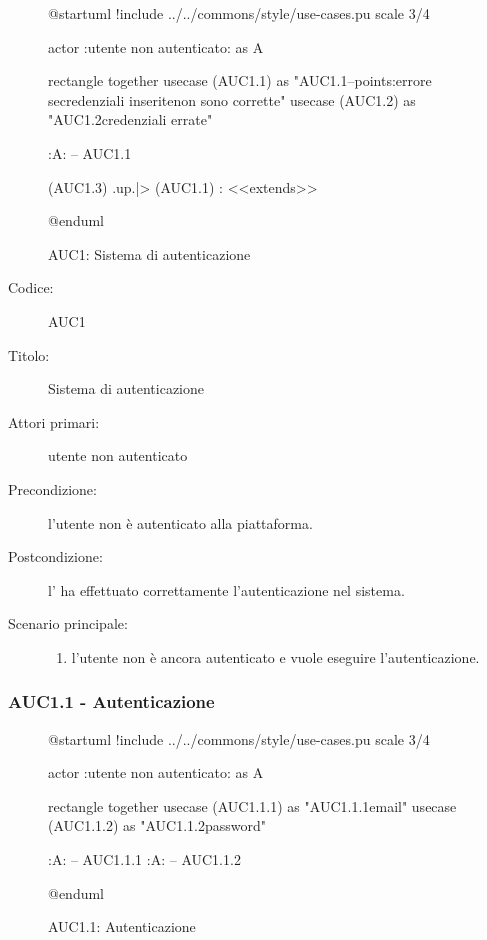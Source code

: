 \documentclass[../../../analisi-dei-requisiti.tex]{subfiles}
\begin{document}
\begin{figure}[h!]
  \centering
  \begin{plantuml}
  @startuml
  !include ../../commons/style/use-cases.pu
  scale 3/4

  actor :utente non autenticato: as A

  rectangle {
    together {
      usecase (AUC1.1) as "AUC1.1\nAutenticazione\n--\nExtension points:\nVisualizzazione errore se\nle credenziali inserite\n non sono corrette"
      usecase (AUC1.2) as "AUC1.2\nVisualizzazione credenziali errate"
    }
  }

  :A: -- AUC1.1

  (AUC1.3) .up.|> (AUC1.1) : <<extends>>

  @enduml
  \end{plantuml}
  \caption{AUC1: Sistema di autenticazione}
  \label{fig:auc1}
\end{figure}

\begin{description}
  \item[Codice:] AUC1
  \item[Titolo:] Sistema di autenticazione
  \item[Attori primari:] utente non autenticato
  \item[Precondizione:] l'utente non è autenticato alla piattaforma.
  \item[Postcondizione:] l' ha effettuato correttamente l'autenticazione nel sistema.
  \item[Scenario principale:]
  \begin{enumerate}
    \item l'utente non è ancora autenticato e vuole eseguire l'autenticazione.
  \end{enumerate}
\end{description}

\subsubsection{AUC1.1 - Autenticazione}%
\label{subsub:AUC1.1}

\begin{figure}[h!]
  \centering
  \begin{plantuml}
  @startuml
  !include ../../commons/style/use-cases.pu
  scale 3/4

  actor :utente non autenticato: as A

  rectangle {
    together {
    usecase (AUC1.1.1) as "AUC1.1.1\nInserimento email"
    usecase (AUC1.1.2) as "AUC1.1.2\nInserimento password"
    }
  }

  :A: -- AUC1.1.1
  :A: -- AUC1.1.2

  @enduml
  \end{plantuml}
  \caption{AUC1.1: Autenticazione}
  \label{fig:auc1_1}
\end{figure}
\end{document}
